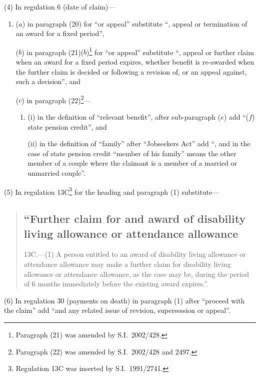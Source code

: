 \documentclass[12pt,a4paper]{article}
\begin{document}
(4) In regulation 6 (date of claim)—
\begin{enumerate}\item[]
($a$) in paragraph (20) for “or appeal” substitute “, appeal or termination of an award for a fixed period”,

($b$) in paragraph (21)($b$)\footnote{Paragraph (21) was amended by S.I.\ 2002/428.} for “or appeal” substitute “, appeal or further claim when an award for a fixed period expires, whether benefit is re-awarded when the further claim is decided or following a revision of, or an appeal against, such a decision”, and

($c$) in paragraph (22)\footnote{Paragraph (22) was amended by S.I.\ 2002/428 and 2497.}—
\begin{enumerate}\item[]
(i) in the definition of “relevant benefit”, after sub-paragraph ($e$)  add “($f$)  state pension credit”, and

(ii) in the definition of “family” after “Jobseekers Act” add “, and in the case of state pension credit “member of his family” means the other member of a couple where the claimant is a member of a married or unmarried couple”.
\end{enumerate}
\end{enumerate}

(5) In regulation 13C\footnote{Regulation 13C was inserted by S.I.\ 1991/2741.} for the heading and paragraph (1) substitute—
\begin{quotation}
\subsection*{“Further claim for and award of disability living allowance or attendance allowance}

13C.---(1)  A person entitled to an award of disability living allowance or attendance allowance may make a further claim for disability living allowance or attendance allowance, as the case may be, during the period of 6 months immediately before the existing award expires.”.
\end{quotation}

(6) In regulation 30 (payments on death) in paragraph (1) after “proceed with the claim” add “and any related issue of revision, supersession or appeal”.
\end{document}
